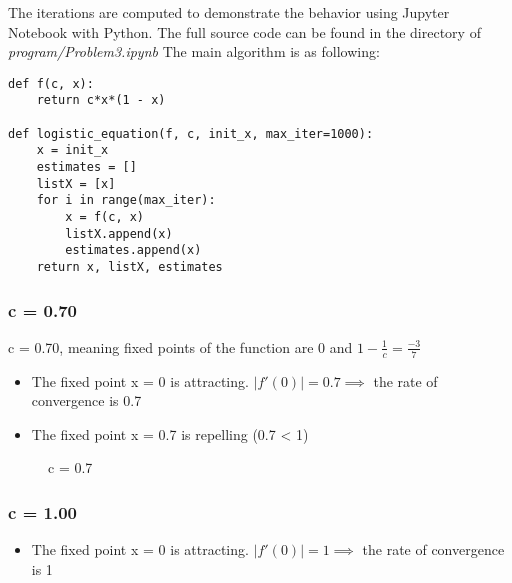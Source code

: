 The iterations are computed to demonstrate the behavior using Jupyter Notebook with Python. The full source code can be found in the directory of \textit{program/Problem3.ipynb}
The main algorithm is as following:
\begin{lstlisting}
def f(c, x):
    return c*x*(1 - x)

def logistic_equation(f, c, init_x, max_iter=1000):
    x = init_x
    estimates = []
    listX = [x]
    for i in range(max_iter):
        x = f(c, x)
        listX.append(x)
        estimates.append(x)
    return x, listX, estimates
\end{lstlisting}

\subsubsection{c = 0.70}
c = 0.70, meaning fixed points of the function are 0 and $1 - \frac{1}{c} = \frac{-3}{7}$

\begin{itemize}
    \item The fixed point x = 0 is attracting. $|f'(0)| = 0.7 \implies$ the rate of convergence is 0.7
    \item The fixed point x = 0.7 is repelling (0.7 < 1)
\end{itemize}

\begin{figure}[H]
\centering
{}
\caption{c = 0.7}
\end{figure}
\newpage

\subsubsection{c = 1.00}
\begin{itemize}
    \item The fixed point x = 0 is attracting. $|f'(0)| = 1 \implies$ the rate of convergence is 1
\end{itemize}


